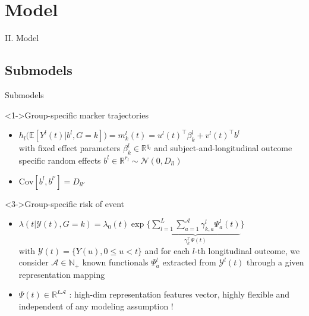 \documentclass{beamer}
\newcommand{\E}{\mathbb E}
\newcommand{\N}{\mathbb N}
\newcommand{\R}{\mathbb R}
\newcommand{\cA}{\mathcal A}
\newcommand{\cY}{\mathcal Y}
\newcommand{\cN}{\mathcal N}
\begin{document}
\section{Model}

\begin{frame}[noframenumbering]
\Large \centering
\textcolor{blue_pres}{II.} Model
\end{frame}

\subsection{Submodels}

\begin{frame}{Submodels}

\small
\begin{block}<1->{Group-specific marker trajectories}
\begin{itemize}
  \footnotesize
  \item<1-> $h_l\big(\E[Y^l(t)|b^l, G=k]\big) = m_k^l(t) = u^l(t)^\top\beta_k^l + v^l(t)^\top b^l$\\
  with fixed effect parameters $\beta_k^l \in \R^{q_l}$ and subject-and-longitudinal outcome specific random effects $b^l \in \R^{r_l} \sim \cN(0, D_{ll})$
  \item<2-> $\text{Cov}[b^l,b^{l'}] = D_{ll'}$

\end{itemize}
\end{block}

\begin{block}<3->{Group-specific risk of event}
\begin{itemize}
  \item<3-> $\lambda(t|\cY(t), G = k) = \lambda_0(t) \exp \Big\{\underbrace{\sum_{l=1}^L \sum_{a=1}^\cA \gamma_{k,a}^l \Psi_a^l(t)}_{\gamma_k^\top \Psi(t)} \Big\}$ \\
    \vspace{.1cm}
    with $\cY(t) = \{Y(u), 0 \leq u < t\}$ and for each $l$-th longitudinal outcome, we consider $\cA \in \N_+$ known functionals $\Psi_a^l$ extracted from $\cY^l(t)$ through a given representation mapping
  \item<4-> $\Psi(t) \in \R^{L\cA}$ : high-dim representation features vector, highly flexible and independent of any modeling assumption !
  
\end{itemize}
\end{block}

\end{frame}
\end{document}
